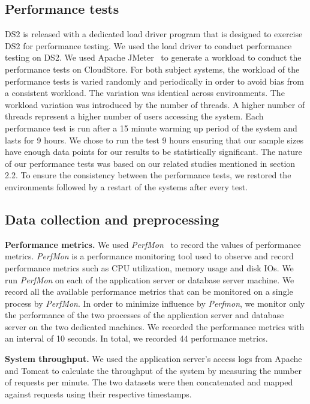 \documentclass[smallextended]{svjour3}       %
\begin{document}
\subsection{Performance tests}

DS2 is released with a dedicated load driver program that is designed to exercise DS2 for performance testing. We used the load driver to conduct performance testing on DS2. We used Apache JMeter~\cite{apachejmeter} to generate a workload to conduct the performance tests on CloudStore. For both subject systems, the workload of the performance tests is varied randomly and periodically in order to avoid bias from a consistent workload. The variation was identical across environments. The workload variation was introduced by the number of threads. A higher number of threads represent a higher number of users accessing the system. Each performance test is run after a 15 minute warming up period of the system and lasts for 9 hours. We chose to run the test 9 hours ensuring that our sample sizes have enough data points for our results to be statistically significant.
The nature of our performance tests was based on our related studies mentioned in section 2.2. To ensure the consistency between the performance tests, we restored the environments followed by a restart of the systems after every test.


\subsection{Data collection and preprocessing}

\noindent \textbf{Performance metrics.} We used \textit{PerfMon}~\cite{perfmon} to record the values of performance metrics. \textit{PerfMon} is a performance monitoring tool used to observe and record performance metrics such as CPU utilization, memory usage and disk IOs. We run \textit{PerfMon} on each of the application server or database server machine. We record all the available performance metrics that can be monitored on a single process by \emph{PerfMon}. In order to minimize influence by \textit{Perfmon}, we monitor only the performance of the two processes of the application server and database server on the two dedicated machines. We recorded the performance metrics with an interval of 10 seconds. In total, we recorded 44 performance metrics.

\noindent \textbf{System throughput.} We used the application server's access logs from Apache and Tomcat to calculate the throughput of the system by measuring the number of requests per minute. The two datasets were then concatenated and mapped against requests using their respective timestamps.
\end{document}
